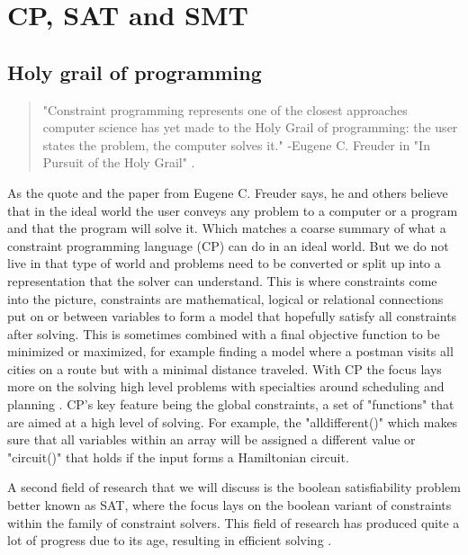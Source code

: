\chapter{CP, SAT and SMT}
\label{cha:CS}
\label{CS:Intro}
\label{CS:HolyGrail}
\section{Holy grail of programming}
\begin{quote}
	"Constraint programming represents one of the closest approaches computer science has yet made to the Holy Grail of programming: the user states the problem, the computer solves it." 
	\newline
	-Eugene C. Freuder in "In Pursuit of the Holy Grail" \cite{11freuder1997pursuitHolyGrail}.
\end{quote}
As the quote and the paper \cite{11freuder1997pursuitHolyGrail} from Eugene C. Freuder says, he and others believe that in the ideal world the user conveys any problem to a computer or a program and that the program will solve it. Which matches a coarse summary of what a constraint programming language (CP) can do in an ideal world. But we do not live in that type of world and problems need to be converted or split up into a representation that the solver can understand. 
This is where constraints come into the picture, constraints are mathematical, logical or relational connections put on or between variables to form a model that hopefully satisfy all constraints after solving. This is sometimes combined with a final objective function to be minimized or maximized, for example finding a model where a postman visits all cities on a route but with a minimal distance traveled. 
With CP the focus lays more on the solving high level problems with specialties around scheduling and planning \cite{52bartak1999constraint}. CP's key feature being the global constraints, a set of "functions" that are aimed at a high level of solving. For example, the "alldifferent()" which makes sure that all variables within an array will be assigned a different value or "circuit()" that holds if the input forms a Hamiltonian circuit.

A second field of research that we will discuss is the boolean satisfiability problem better known as SAT, where the focus lays on the boolean variant of constraints within the family of constraint solvers. This field of research has produced quite a lot of progress due to its age, resulting in efficient solving \cite{56bardin2019bringing}.


